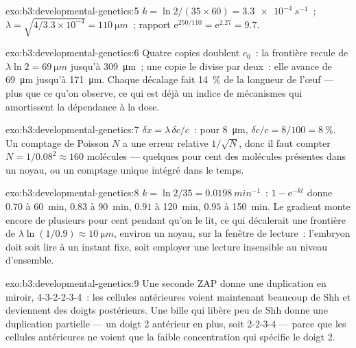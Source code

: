 \begin{solution}{exo:b3:developmental-genetics:5}
$k = \ln 2/(35\times 60) = \qty{3.3e-4}{s^{-1}}$~; $\lambda = \sqrt{4/
3.3\times 10^{-4}} = \qty{110}{\micro m}$~; rapport $\mathrm{e}^{250/110}
= \mathrm{e}^{2.27} = 9.7$.
\end{solution}

\begin{solution}{exo:b3:developmental-genetics:6}
Quatre copies doublent $c_{0}$~: la frontière recule de $\lambda\ln 2 =
\qty{69}{\micro m}$ jusqu'à \qty{309}{\micro m}~; une copie le divise par
deux~: elle avance de \qty{69}{\micro m} jusqu'à \qty{171}{\micro m}.
Chaque décalage fait \qty{14}{\%} de la longueur de l'œuf --- plus que
ce qu'on observe, ce qui est déjà un indice de mécanismes qui amortissent
la dépendance à la dose.
\end{solution}

\begin{solution}{exo:b3:developmental-genetics:7}
$\delta x = \lambda\,\delta c/c$~: pour \qty{8}{\micro m}, $\delta c/c =
8/100 = \qty{8}{\%}$. Un comptage de Poisson $N$ a une erreur relative
$1/\sqrt{N}$, donc il faut compter $N = 1/0.08^{2} \approx 160$
molécules --- quelques pour cent des molécules présentes dans un noyau,
ou un comptage unique intégré dans le temps.
\end{solution}

\begin{solution}{exo:b3:developmental-genetics:8}
$k = \ln 2/35 = \qty{0.0198}{min^{-1}}$~: $1 - \mathrm{e}^{-kt}$ donne
$0.70$ à \qty{60}{min}, $0.83$ à \qty{90}{min}, $0.91$ à
\qty{120}{min}, $0.95$ à \qty{150}{min}. Le gradient monte encore de
plusieurs pour cent pendant qu'on le lit, ce qui décalerait une frontière
de $\lambda\ln(1/0.9) \approx \qty{10}{\micro m}$, environ un noyau, sur
la fenêtre de lecture~: l'embryon doit soit lire à un instant fixe, soit
employer une lecture insensible au niveau d'ensemble.
\end{solution}

\begin{solution}{exo:b3:developmental-genetics:9}
Une seconde ZAP donne une duplication en miroir, 4-3-2-2-3-4~: les
cellules antérieures voient maintenant beaucoup de Shh et deviennent des
doigts postérieurs. Une bille qui libère peu de Shh donne une
duplication partielle --- un doigt 2 antérieur en plus, soit 2-2-3-4 ---
parce que les cellules antérieures ne voient que la faible concentration
qui spécifie le doigt 2.
\end{solution}

